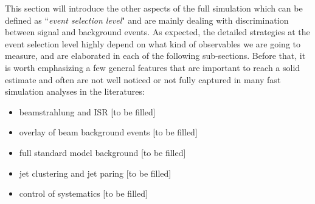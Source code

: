 This section will introduce the other aspects of the full simulation which can be
defined as ``{\it event selection level}" and are mainly dealing with discrimination 
between signal and background events. As expected, the detailed strategies 
at the event selection level highly depend on what kind of observables we are going to
measure, and are elaborated in each of the following sub-sections. Before that, it is worth
emphasizing a few general features that are important to reach a solid estimate
and often are not well noticed or not fully captured in 
many fast simulation analyses in the literatures:


\begin{itemize}
\item beamstrahlung and ISR
[to be filled]
\item overlay of beam background events
[to be filled]
\item full standard model background
[to be filled]
\item jet clustering and jet paring
[to be filled]
\item control of systematics 
[to be filled]
\end{itemize}

